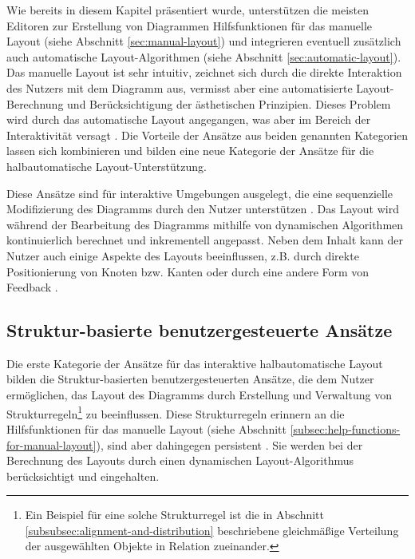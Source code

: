 Wie bereits in diesem Kapitel präsentiert wurde, unterstützen die meisten Editoren zur Erstellung von Diagrammen Hilfsfunktionen für das manuelle Layout (siehe Abschnitt \ref{sec:manual-layout}) und integrieren eventuell zusätzlich auch automatische Layout-Algorithmen (siehe Abschnitt \ref{sec:automatic-layout}). Das manuelle Layout ist sehr intuitiv, zeichnet sich durch die direkte Interaktion des Nutzers mit dem Diagramm aus, vermisst aber eine automatisierte Layout-Berechnung und Berücksichtigung der ästhetischen Prinzipien. Dieses Problem wird durch das automatische Layout angegangen, was aber im Bereich der Interaktivität versagt \cite{GladischSchumann14Semi-Automatic}. Die Vorteile der Ansätze aus beiden genannten Kategorien lassen sich kombinieren und bilden eine neue Kategorie der Ansätze für die halbautomatische Layout-Unterstützung.

Diese Ansätze sind für interaktive Umgebungen ausgelegt, die eine sequenzielle Modifizierung des Diagramms durch den Nutzer unterstützen \cite{Arvo02Techniques, GladischSchumann14Semi-Automatic, Wybrow08Using}. Das Layout wird während der Bearbeitung des Diagramms mithilfe von dynamischen Algorithmen kontinuierlich berechnet und inkrementell angepasst. Neben dem Inhalt kann der Nutzer auch einige Aspekte des Layouts beeinflussen, z.B. durch direkte Positionierung von Knoten bzw. Kanten oder durch eine andere Form von Feedback \cite{Arvo02Techniques}.

\subsection{Struktur-basierte benutzergesteuerte Ansätze}
\label{subsec:structure-based-user-controlled-approaches}

Die erste Kategorie der Ansätze für das interaktive halbautomatische Layout bilden die Struktur-basierten benutzergesteuerten Ansätze, die dem Nutzer ermöglichen, das Layout des Diagramms durch Erstellung und Verwaltung von Strukturregeln\footnote{Ein Beispiel für eine solche Strukturregel ist die in Abschnitt \ref{subsubsec:alignment-and-distribution} beschriebene gleichmäßige Verteilung der ausgewählten Objekte in Relation zueinander.} zu beeinflussen. Diese Strukturregeln erinnern an die Hilfsfunktionen für das manuelle Layout (siehe Abschnitt \ref{subsec:help-functions-for-manual-layout}), sind aber dahingegen persistent \cite{Wybrow08Using}. Sie werden bei der Berechnung des Layouts durch einen dynamischen Layout-Algorithmus berücksichtigt und eingehalten.

